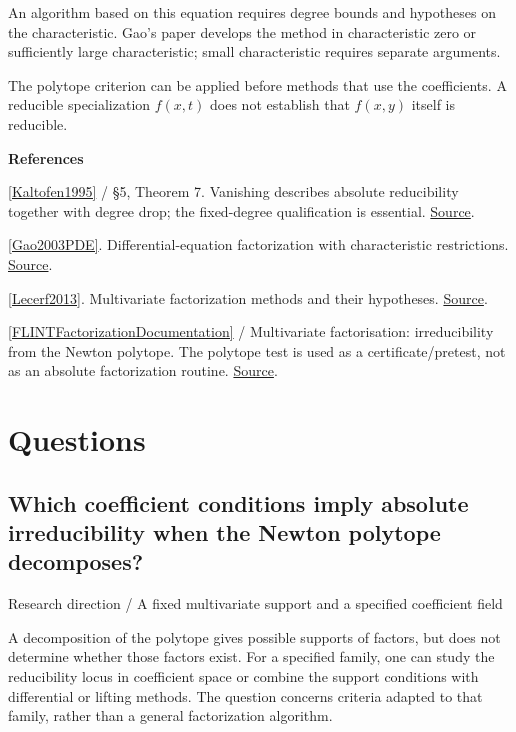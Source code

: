 \documentclass[11pt,a4paper,oneside,openany]{book}
\newcommand{\atlasdisplay}[1]{\par\begingroup\centering\vspace{3pt}\noindent\adjustbox{max width=\linewidth}{\(\displaystyle #1\)}\par\vspace{5pt}\endgroup}
\newenvironment{sources}{\par\smallskip\begingroup\footnotesize\color{atlasgray}\leftskip=10pt\setlength{\parskip}{2pt}}{\par\endgroup\smallskip}
\begin{document}
\atlasdisplay{f\,(g_y-h_x)=g f_y-h f_x.}
\color{black} An algorithm based on this equation requires degree bounds and hypotheses on the characteristic. Gao's paper develops the method in characteristic zero or sufficiently large characteristic; small characteristic requires separate arguments.\par
\color{black} The polytope criterion can be applied before methods that use the coefficients. A reducible specialization \(f(x,t)\) does not establish that \(f(x,y)\) itself is reducible.\par
\begin{sources}
\textbf{References}\par\smallskip
\noindent\hyperlink{ref:Kaltofen1995}{[Kaltofen1995]} / §5, Theorem 7. Vanishing describes absolute reducibility together with degree drop; the fixed-degree qualification is essential. \href{https://www.sciencedirect.com/science/article/pii/S0022000085710239}{Source}.\par
\noindent\hyperlink{ref:Gao2003PDE}{[Gao2003PDE]}. Differential-equation factorization with characteristic restrictions. \href{https://doi.org/10.1090/S0025-5718-02-01428-X}{Source}.\par
\noindent\hyperlink{ref:Lecerf2013}{[Lecerf2013]}. Multivariate factorization methods and their hypotheses. \href{https://www.numdam.org/articles/10.5802/ccirm.18/}{Source}.\par
\noindent\hyperlink{ref:FLINTFactorizationDocumentation}{[FLINTFactorizationDocumentation]} / Multivariate factorisation: irreducibility from the Newton polytope. The polytope test is used as a certificate/pretest, not as an absolute factorization routine. \href{https://flintlib.org/doc/algorithms/polynomials/factoring-finite-fields.html}{Source}.\par
\end{sources}\color{black}
\section*{Questions}
\subsection*{Which coefficient conditions imply absolute irreducibility when the Newton polytope decomposes?}
{\small\sffamily\color{atlasgold}Research direction / A fixed multivariate support and a specified coefficient field}\par\smallskip
\color{black} A decomposition of the polytope gives possible supports of factors, but does not determine whether those factors exist. For a specified family, one can study the reducibility locus in coefficient space or combine the support conditions with differential or lifting methods. The question concerns criteria adapted to that family, rather than a general factorization algorithm.\par
\end{document}
